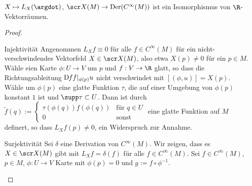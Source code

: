 \begin{st} \label{3.16}
    $X \mapsto L_X(\argdot)$, $\scr X(M) \to \Der(C^\infty(M))$ ist ein Isomorphismus von $\R$-Vektorräumen.
    \begin{proof}
        \begin{seg}{Injektivität}
            Angenommen $L_X f \equiv 0$ für alle $f \in C^\infty(M)$ für ein nicht-verschwindendes Vektorfeld $X \in \scr X(M)$, also etwa $X(p) \neq 0$ für ein $p \in M$.
            Wähle eien Karte $\phi: U \to V$ um $p$ und $f: V \to \R$ glatt, so dass die Richtungsableitung $\Df f|_{\phi(p)} u$ nicht verschwindet mit $[(\phi, u)] = X(p)$.
            Wähle um $\phi(p)$ eine glatte Funktion $\tau$, die auf einer Umgebung von $\phi(p)$ konstant $1$ ist und $\supp \tau \subset U$. 
            Dann ist durch
            \begin{math}
                \tilde f(q) := \begin{cases}
                    \tau(\phi(q)) f(\phi(q)) & \text{für $q \in U$} \\
                    0 & \text{sonst}
                \end{cases}
            \end{math}
            eine glatte Funktion auf $M$ definert, so dass $L_X f(p) \neq 0$, ein Widerspruch zur Annahme.
        \end{seg}
        \begin{seg}{Surjektivität}
            Sei $\delta$ eine Derivation von $C^\infty(M)$.
            Wir zeigen, dass es $X \in \scr X(M)$ gibt mit $L_X f = \delta(f)$ für alle $f \in C^\infty(M)$. 
            Sei $f \in C^\infty(M)$, $p \in M$, $\phi: U \to V$ Karte mit $\phi(p) = 0$ und $g := f \circ \phi^{-1}$.


\end{seg}
\end{proof}
\end{st}
